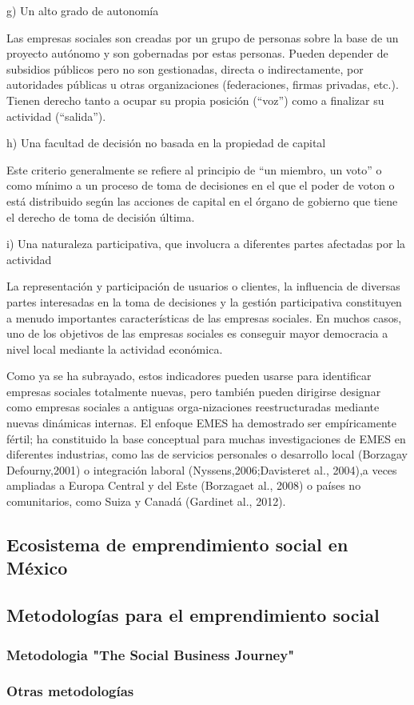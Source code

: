 \documentclass[11pt]{article}
\begin{document}
g)  Un  alto   grado de  autonomía 

Las   empresas sociales son   creadas por   un  grupo de  personas sobre la base de  un  proyecto autónomo y son   gobernadas por   estas personas. Pueden depender de  subsidios públicos pero no  son   gestionadas, directa o indirectamente, por   autoridades públicas u otras organizaciones (federaciones, firmas privadas, etc.). Tienen derecho tanto a ocupar su propia posición (“voz”) como a finalizar su actividad (“salida”).

h)  Una facultad de  decisión no  basada en  la propiedad de  capital

Este criterio generalmente se  refiere al  principio de  “un  miembro, un  voto” o como mínimo a un proceso de  toma de  decisiones en  el  que   el  poder de  voton o  está distribuido según las  acciones de capital en  el  órgano de  gobierno que   tiene el  derecho de  toma de  decisión última.

i)  Una naturaleza participativa, que   involucra a diferentes partes afectadas por   la actividad  

La  representación y participación de  usuarios o clientes, la influencia de  diversas partes interesadas en  la toma de  decisiones y  la gestión participativa constituyen a menudo importantes características de  las  empresas sociales. En  muchos casos, uno   de  los  objetivos de  las  empresas sociales es   conseguir mayor democracia a nivel local mediante la actividad económica.


Como ya  se  ha  subrayado, estos indicadores pueden usarse para identificar empresas sociales totalmente nuevas, pero también pueden dirigirse designar como empresas sociales a antiguas orga-nizaciones reestructuradas mediante nuevas dinámicas internas. El  enfoque EMES ha  demostrado ser   empíricamente fértil; ha  constituido la base conceptual para muchas investigaciones de  EMES en  diferentes industrias, como las  de  servicios personales o desarrollo local (Borzagay Defourny,2001) o integración laboral (Nyssens,2006;Davisteret  al.,   2004),a veces ampliadas a Europa Central y del Este (Borzagaet  al.,   2008) o países no  comunitarios, como Suiza y Canadá (Gardinet  al.,   2012).


\subsection{Ecosistema de emprendimiento social en México}
\label{sec:orgae6e1e4}


\subsection{Metodologías para el emprendimiento social}
\label{sec:org8c7816c}

\subsubsection{Metodologia "The Social Business Journey"}
\label{sec:org1ea5728}

\subsubsection{Otras metodologías}
\label{sec:org9f17ba3}
\end{document}
